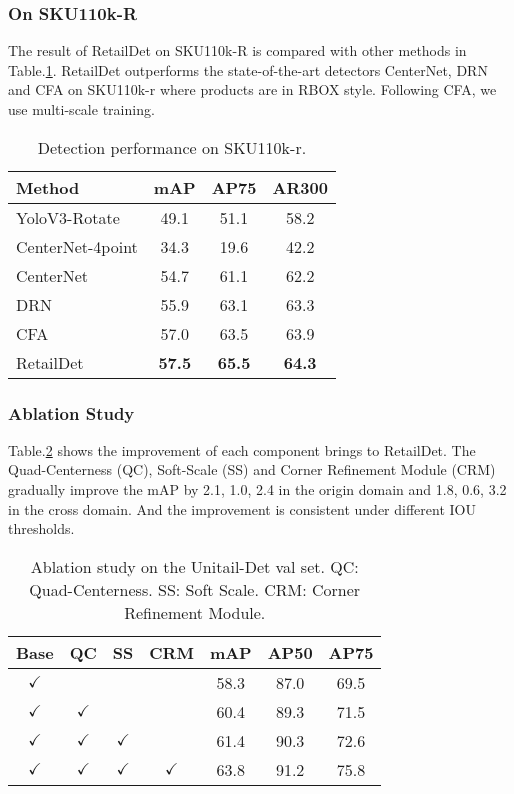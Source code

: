 \documentclass[runningheads]{llncs}
\begin{document}
\subsubsection{On SKU110k-R}
The result of RetailDet on SKU110k-R is compared with other methods in Table.\ref{table_sku110kr}. RetailDet outperforms the state-of-the-art detectors CenterNet\cite{xingyi2019centernet}, DRN \cite{SKU110k-r} and CFA \cite{Guo_2021_CFA} on SKU110k-r where products are in RBOX style. Following CFA, we use multi-scale training.
\begin{table}[t]
\centering
\begin{tabular}{l|ccc}
\hline \hline
Method           & mAP    & AP75    & AR300 \\ \hline
YoloV3-Rotate\cite{redmon2018yolov3}    & 49.1   & 51.1    & 58.2  \\
CenterNet-4point\cite{xingyi2019centernet} & 34.3   & 19.6    & 42.2  \\
CenterNet\cite{xingyi2019centernet}        & 54.7   & 61.1    & 62.2  \\
DRN\cite{SKU110k-r}              & 55.9   & 63.1    & 63.3  \\ 
CFA\cite{Guo_2021_CFA}              & 57.0   & 63.5    & 63.9  \\ 
RetailDet  & \textbf{57.5}   & \textbf{65.5}    & \textbf{64.3}  \\ 
\hline
\end{tabular}
\caption{Detection performance on SKU110k-r.}
\label{table_sku110kr}
\end{table}

\subsubsection{Ablation Study} Table.\ref{table_ablation_retaildet} shows the improvement of each component brings to RetailDet. The Quad-Centerness (QC), Soft-Scale (SS) and 
Corner Refinement Module (CRM) gradually improve the mAP by 2.1, 1.0, 2.4 in the origin domain and 1.8, 0.6, 3.2 in the cross domain. And the improvement is consistent under different IOU thresholds.

\begin{table}[t]
\centering
\begin{tabular}{cccc|ccc}
\hline \hline
Base      &QC & SS & CRM & mAP  & AP50 & AP75 \\ \hline
$\checkmark$    &   &    &          & 58.3 & 87.0 & 69.5  \\
$\checkmark$ &$\checkmark$&&       & 60.4 & 89.3 & 71.5  \\
$\checkmark$ &$\checkmark$&$\checkmark$&&61.4&90.3&72.6 \\
$\checkmark$ &$\checkmark$&$\checkmark$&$\checkmark$&63.8& 91.2 & 75.8 \\
\hline
\end{tabular}
\caption{Ablation study on the Unitail-Det val set. QC: Quad-Centerness. SS: Soft Scale. CRM: Corner Refinement Module.}
\label{table_ablation_retaildet}
\end{table}
\end{document}
